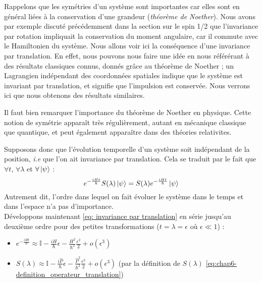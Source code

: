 \documentclass[../notesdecours]{subfiles}
\begin{document}
Rappelons que les symétries d'un système sont importantes car elles sont en général liées à la conservation d'une grandeur (\textit{théorème de Noether}). Nous avons par exemple discuté précédemment dans la section sur le spin 1/2 que l'invariance par rotation impliquait la conservation du moment angulaire, car il commute avec le Hamiltonien du système. Nous allons voir ici la conséquence d'une invariance par translation. En effet, nous pouvons nous faire une idée en nous référérant à des résultats classiques connus, donnés grâce au théorème de Noether ; un Lagrangien indépendant des coordonnées spatiales indique que le système est invariant par translation, et signifie que l'impulsion est conservée. Nous verrons ici que nous obtenons des résultats similaires. \\

\begin{remark}
    Il faut bien remarquer l'importance du théorème de Noether en physique. Cette notion de symétrie apparaît très régulièrement, autant en mécanique classique que quantique, et peut également apparaître dans des théories relativites. \\
\end{remark}

Supposons donc que l'évolution temporelle d'un système soit indépendant de la position, \textit{i.e} que l'on ait invariance par translation. Cela se traduit par le fait que $\forall t$, $\forall \lambda$ et $\forall \ket{\psi}$ : \begin{equation}
    e^{-\frac{iHt}{\hbar}} S(\lambda) \ket{\psi} = S(\lambda) e^{-\frac{iHt}{\hbar}} \ket{\psi} 
\label{eq: invariance par translation}
\end{equation}
Autrement dit, l'ordre dans lequel on fait évoluer le système dans le temps et dans l'espace n'a pas d'importance. \\
Développons maintenant \eqref{eq: invariance par translation} en série jusqu'au deuxième ordre pour des petites transformations ($t = \lambda = \epsilon$ où $\epsilon \ll 1$) : 
\begin{itemize}[label = \textbullet]
    \item $ e^{-\frac{iHt}{\hbar}} \approx \mathbb{I} - \frac{iH}{\hbar}\epsilon - \frac{H^2}{\hbar^2}\frac{\epsilon^2}{2} + o(\epsilon^3)$ 
    \item $ S(\lambda) \approx \mathbb{I} - \frac{i\hat{P}}{\hbar}\epsilon - \frac{\hat{P}^2}{\hbar^2}\frac{\epsilon^2}{2} + o(\epsilon^3)$ (par la définition de $S(\lambda)$ \eqref{eq:chap6-definition_operateur_translation})
\end{itemize}
\end{document}
